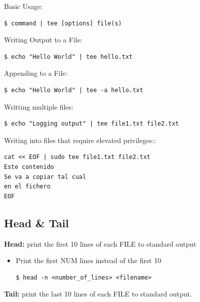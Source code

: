 \documentclass{article}
\newenvironment{codetemplate}[1][]{%
  \mybasecolorbox[#1]
  \itshape
}{%
  \endmybasecolorbox
}
\begin{document}
Basic Usage:
\begin{codetemplate}{}
\begin{verbatim}
$ command | tee [options] file(s)
\end{verbatim}
\end{codetemplate}

Writing Output to a File:
\begin{codetemplate}{}
\begin{verbatim}
$ echo "Hello World" | tee hello.txt
\end{verbatim}
\end{codetemplate}

Appending to a File:
\begin{codetemplate}{}
\begin{verbatim}
$ echo "Hello World" | tee -a hello.txt
\end{verbatim}
\end{codetemplate}

Writting multiple files:
\begin{codetemplate}{}
\begin{verbatim}
$ echo "Logging output" | tee file1.txt file2.txt
\end{verbatim}
\end{codetemplate}

Writing into files that require elevated privileges::
\begin{codetemplate}{}
\begin{verbatim}
cat << EOF | sudo tee file1.txt file2.txt
Este contenido
Se va a copiar tal cual
en el fichero
EOF
\end{verbatim}
\end{codetemplate}

\subsection{Head \& Tail}
\textbf{Head:} print the first 10 lines of each FILE to standard output

\begin{itemize}
    \item Print the first NUM lines instead of the first 10
\begin{codetemplate}{}
\begin{verbatim}
$ head -n <number_of_lines> <filename>
\end{verbatim}
\end{codetemplate}
\end{itemize}

\textbf{Tail:}  print the last 10 lines of each FILE to standard output.
\end{document}
